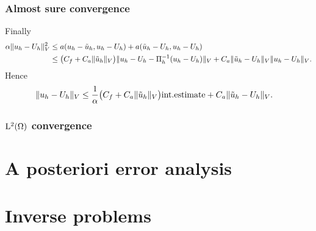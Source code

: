 \documentclass[10pt]{article}
\begin{document}
\subsubsection*{Almost sure convergence}

Finally
\begin{equation}
\begin{aligned}
\alpha \lVert u_h - U_h\rVert_V^2 &\leq a(u_h - \tilde u_h, u_h - U_h) + a(\tilde u_h - U_h, u_h - U_h)\\
&\leq \big(C_f + C_a \lVert\tilde u_h\rVert_V \big) \lVert u_h - U_h - \Pi_h^{-1}(u_h - U_h)\rVert_V + C_a \lVert\tilde u_h - U_h\rVert_V \lVert u_h - U_h\rVert_V.
\end{aligned}
\end{equation}
Hence
\begin{equation}
\begin{aligned}
\lVert u_h - U_h\rVert_V &\leq \frac{1}{\alpha} \big(C_f + C_a \lVert\tilde u_h\rVert_V \big) \mathrm{int. estimate} + C_a \lVert\tilde u_h - U_h\rVert_V.
\end{aligned}
\end{equation}

\subsubsection*{$\mathrm L^2(\Omega)$ convergence}

\section{A posteriori error analysis}

\section{Inverse problems}
\end{document}
